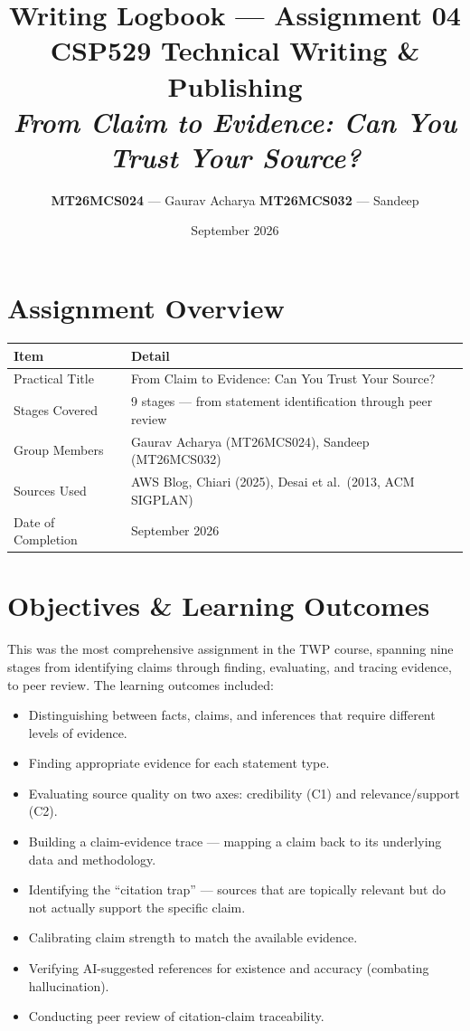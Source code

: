 \documentclass[11pt, a4paper]{article}
\title{
    \vspace{-1cm}
    \textbf{Writing Logbook --- Assignment 04} \\[0.3em]
    \large CSP529 Technical Writing \& Publishing \\[0.2em]
    \large \textit{From Claim to Evidence: Can You Trust Your Source?}
}
\author{
    \textbf{MT26MCS024} --- Gaurav Acharya \quad
    \textbf{MT26MCS032} --- Sandeep
}
\date{September 2026}
\begin{document}
\maketitle
\thispagestyle{fancy}

\section{Assignment Overview}

\begin{tabular}{@{}p{4.5cm} p{10cm}@{}}
    \toprule
    \textbf{Item} & \textbf{Detail} \\
    \midrule
    Practical Title & From Claim to Evidence: Can You Trust Your Source? \\
    Stages Covered & 9 stages --- from statement identification through peer review \\
    Group Members & Gaurav Acharya (MT26MCS024), Sandeep (MT26MCS032) \\
    Sources Used & AWS Blog, Chiari (2025), Desai et al.\ (2013, ACM SIGPLAN) \\
    Date of Completion & September 2026 \\
    \bottomrule
\end{tabular}

\section{Objectives \& Learning Outcomes}

This was the most comprehensive assignment in the TWP course, spanning nine stages from identifying claims through finding, evaluating, and tracing evidence, to peer review. The learning outcomes included:

\begin{itemize}[nosep]
    \item Distinguishing between facts, claims, and inferences that require different levels of evidence.
    \item Finding appropriate evidence for each statement type.
    \item Evaluating source quality on two axes: credibility (C1) and relevance/support (C2).
    \item Building a claim-evidence trace --- mapping a claim back to its underlying data and methodology.
    \item Identifying the ``citation trap'' --- sources that are topically relevant but do not actually support the specific claim.
    \item Calibrating claim strength to match the available evidence.
    \item Verifying AI-suggested references for existence and accuracy (combating hallucination).
    \item Conducting peer review of citation-claim traceability.
\end{itemize}
\end{document}
